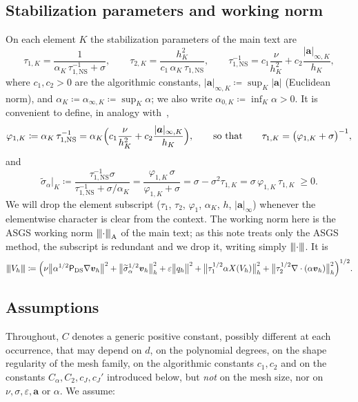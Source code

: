 \documentclass[11pt,a4paper]{article}
\newcommand{\ba}{\boldsymbol{a}}
\newcommand{\bvh}{\boldsymbol{v}_h}
\newcommand{\ViscProj}{\mathsf{P}_{\mathrm{DS}}}
\newcommand{\X}{X}
\newcommand{\triplenorm}[1]{{\lvert\kern-0.25ex\lvert\kern-0.25ex\lvert #1
\rvert\kern-0.25ex\rvert\kern-0.25ex\rvert}}
\newcommand{\sigmatilde}{\widetilde{\sigma}_{\alpha}}
\theoremstyle{plain}
\theoremstyle{remark}
\theoremstyle{definition}
\numberwithin{equation}{section}
\begin{document}
\subsection{Stabilization parameters and working norm}
On each element $K$ the stabilization parameters of the main text are
\begin{equation}\label{eq:taus}
  \tau_{1,K} = \frac{1}{\alpha_K\,\tau_{1,\mathrm{NS}}^{-1} + \sigma},
  \qquad
  \tau_{2,K} = \frac{h_K^2}{c_1\,\alpha_K\,\tau_{1,\mathrm{NS}}},
  \qquad
  \tau_{1,\mathrm{NS}}^{-1}
  = c_1\frac{\nu}{h_K^2} + c_2\frac{|\ba|_{\infty,K}}{h_K},
\end{equation}
where $c_1,c_2>0$ are the algorithmic constants,
$|\ba|_{\infty,K}\coloneqq\sup_K|\ba|$ (Euclidean norm), and
$\alpha_K\coloneqq\alpha_{\infty,K}\coloneqq\sup_K\alpha$; we also write
$\alpha_{0,K}\coloneqq\inf_K\alpha>0$. It is convenient to define, in analogy
with~\cite{codina2001},
\begin{equation}\label{eq:phi1}
  \varphi_{1,K} \coloneqq \alpha_K\,\tau_{1,\mathrm{NS}}^{-1}
  = \alpha_K\Bigl(c_1\frac{\nu}{h_K^2}+c_2\frac{|\ba|_{\infty,K}}{h_K}\Bigr),
  \qquad\text{so that}\qquad
  \tau_{1,K} = \bigl(\varphi_{1,K}+\sigma\bigr)^{-1},
\end{equation}
and
\begin{equation}\label{eq:sigmatilde}
  \sigmatilde\big|_K
  \coloneqq \frac{\tau_{1,\mathrm{NS}}^{-1}\sigma}{\tau_{1,\mathrm{NS}}^{-1}
  + \sigma/\alpha_K}
  = \frac{\varphi_{1,K}\,\sigma}{\varphi_{1,K}+\sigma}
  = \sigma - \sigma^2\tau_{1,K}
  = \sigma\,\varphi_{1,K}\,\tau_{1,K}\;\ge 0 .
\end{equation}
We will drop the element subscript ($\tau_1$, $\tau_2$, $\varphi_1$, $\alpha_K$, $h$,
$|\ba|_\infty$) whenever the elementwise character is clear from the context. The working
norm here is the ASGS working norm $\triplenorm{\cdot}_{\mathrm{A}}$ of the main text; as this
note treats only the ASGS method, the subscript is redundant and we drop it, writing simply
$\triplenorm{\cdot}$. It is
\begin{equation}\label{eq:triplenorm}
  \triplenorm{V_h}
  \coloneqq \Bigl(
  \nu\bigl\lVert\alpha^{1/2}\ViscProj\nabla\bvh\bigr\rVert^2
  + \bigl\lVert\sigmatilde^{1/2}\bvh\bigr\rVert_h^2
  + \varepsilon\bigl\lVert q_h \bigr\rVert^2
  + \bigl\lVert\tau_1^{1/2}\alpha\X(V_h)\bigr\rVert_h^2
  + \bigl\lVert\tau_2^{1/2}\nabla\cdot(\alpha\bvh)\bigr\rVert_h^2
  \Bigr)^{1/2}.
\end{equation}

\subsection{Assumptions}\label{sec:assumptions}
Throughout, $C$ denotes a generic positive constant, possibly different at each occurrence,
that may depend on $d$, on the polynomial degrees, on the shape regularity of the mesh
family, on the algorithmic constants $c_1,c_2$ and on the constants
$C_\alpha,C_2,c_J,c_J'$ introduced below, but \emph{not} on the mesh size, nor on
$\nu,\sigma,\varepsilon,\ba$ or $\alpha$. We assume:
\end{document}
